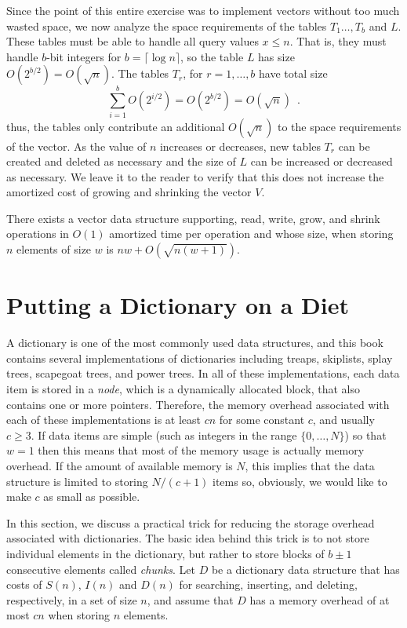 Since the point of this entire exercise was to implement vectors without
too much wasted space, we now analyze the space requirements of the tables
$T_1\ldots,T_b$ and $L$.  These tables must be able to handle all query
values $x\le n$.  That is, they must handle $b$-bit integers for $b =
\lceil\log n\rceil$, so the table $L$ has size $O(2^{b/2})=O(\sqrt{n})$.
The tables $T_r$, for $r=1,\ldots,b$ have total size
\[
   \sum_{i=1}^b O(2^{i/2}) = O(2^{b/2}) = O(\sqrt{n}) \enspace .
\]
thus, the tables only contribute an additional $O(\sqrt n)$ to the space
requirements of the vector.  As the value of $n$ increases or decreases,
new tables $T_r$ can be created and deleted as necessary and the size of
$L$ can be increased or decreased as necessary.  We leave it to the reader
to verify that this does not increase the amortized cost of growing and
shrinking the vector $V$.

\begin{thm}
There exists a vector data structure supporting, read, write, grow, and
shrink operations in $O(1)$ amortized time per operation and whose size,
when storing $n$ elements of size $w$ is $nw + O(\sqrt{n(w+1)})$.
\end{thm}


\section{Putting a Dictionary on a Diet}


A dictionary is one of the most commonly used data structures, and this
book contains several implementations of dictionaries including treaps,
skiplists, splay trees, scapegoat trees, and power trees.  In all of
these implementations, each data item is stored in a \emph{node},
which is a dynamically allocated block, that also contains one or
more pointers.  Therefore, the memory overhead associated with each
of these implementations is at least $cn$ for some constant $c$,
and usually $c\ge 3$.  If data items are simple (such as integers in
the range $\{0,\ldots,N\}$) so that $w=1$ then this means that
most of the memory usage is actually memory overhead.  If the amount of
available memory is $N$, this implies that the data structure is limited
to storing $N/(c+1)$ items so, obviously, we would like to make $c$
as small as possible.

In this section, we discuss a practical trick for reducing the storage
overhead associated with dictionaries.  The basic idea behind this trick is
to not store individual elements in the dictionary, but rather to store
blocks of $b\pm 1$ consecutive elements called \emph{chunks}.  Let $D$ be a
dictionary data structure that has costs of $S(n)$, $I(n)$ and $D(n)$ for
searching, inserting, and deleting, respectively, in a set of size $n$, and
assume that $D$ has a memory overhead of at most $cn$ when storing $n$
elements.

